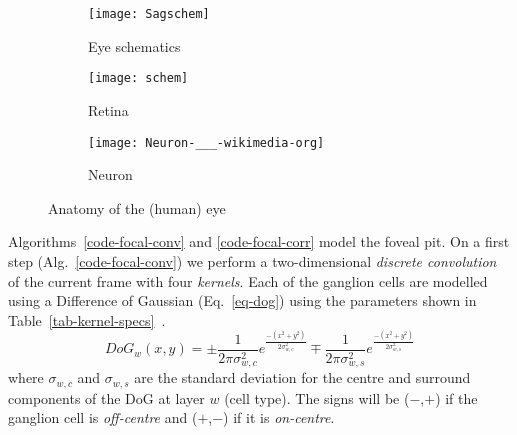 \begin{figure}[hbt]
  \centering
  \begin{subfigure}[b]{0.15\textwidth}
    \centering
    \texttt{[image: Sagschem]}
    \caption{Eye schematics}
    \label{sub-fig-eye-schematics}
  \end{subfigure}
  \begin{subfigure}[b]{0.15\textwidth}
    \centering
    \texttt{[image: schem]}
    \caption{Retina}
    \label{sub-fig-retinal-layers}
  \end{subfigure}
  \begin{subfigure}[b]{0.15\textwidth}
    \centering
    \texttt{[image: Neuron-\_\_\_-wikimedia-org]}
    \caption{Neuron}
    \label{sub-fig-neuron}
  \end{subfigure}
  
  \caption{Anatomy of the (human) eye \cite{wiki-images}}
  \label{fig-basic-eye-anatomy}
\end{figure}

Algorithms~\ref{code-focal-conv} and \ref{code-focal-corr} model the foveal 
pit. On a first step (Alg.~\ref{code-focal-conv}) we perform a two-dimensional 
\emph{discrete convolution} of the current frame with four \emph{kernels}. 
Each of the ganglion cells are modelled using a Difference of Gaussian 
(Eq.~\ref{eq-dog}) using the parameters shown in 
Table~\ref{tab-kernel-specs}~\cite{field-sensory-coding,basab-model}.
\begin{equation}
\label{eq-dog}
DoG_w(x,y) = \pm\frac{1}{2\pi\sigma_{w,c}^2}e^{\frac{-(x^2 + y^2)}{2\sigma_{w,c}^2}}
\mp\frac{1}{2\pi\sigma_{w,s}^2}e^{\frac{-(x^2 + y^2)}{2\sigma_{w,s}^2}}
\end{equation}
where $\sigma_{w,c}$ and $\sigma_{w,s}$ are the standard deviation for the 
centre and surround components of the DoG at layer $w$ (cell type). The signs 
will be ($-$,$+$) if the ganglion cell is \emph{off-centre} and ($+$,$-$) if it 
is \emph{on-centre}.\\

